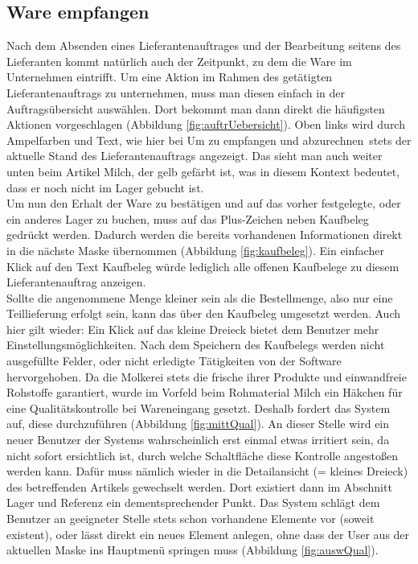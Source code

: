 \subsection{Ware empfangen}
Nach dem Absenden eines Lieferantenauftrages und der Bearbeitung seitens des Lieferanten kommt natürlich auch der Zeitpunkt, zu dem die Ware im Unternehmen eintrifft. Um eine Aktion im Rahmen des getätigten Lieferantenauftrags zu unternehmen, muss man diesen einfach in der Auftragsübersicht auswählen. Dort bekommt man dann direkt die häufigsten Aktionen vorgeschlagen (\vgl Abbildung \ref{fig:auftrUebersicht}). Oben links wird durch Ampelfarben und Text, wie hier bei \glqq Um zu empfangen und abzurechnen\grqq\ stets der aktuelle Stand des Lieferantenauftrags angezeigt. Das sieht man auch weiter unten beim Artikel Milch, der gelb gefärbt ist, was in diesem Kontext bedeutet, dass er noch nicht im Lager gebucht ist.\\
Um nun den Erhalt der Ware zu bestätigen und auf das vorher festgelegte, oder ein anderes Lager zu buchen, muss auf das Plus-Zeichen neben Kaufbeleg gedrückt werden. Dadurch werden die bereits vorhandenen Informationen direkt in die nächste Maske übernommen (\vgl Abbildung \ref{fig:kaufbeleg}). Ein einfacher Klick auf den Text Kaufbeleg würde lediglich alle offenen Kaufbelege zu diesem Lieferantenauftrag anzeigen. \\
Sollte die angenommene Menge kleiner sein als die Bestellmenge, also nur eine Teillieferung erfolgt sein, kann das über den Kaufbeleg umgesetzt werden. Auch hier gilt wieder: Ein Klick auf das kleine Dreieck bietet dem Benutzer mehr Einstellungsmöglichkeiten. Nach dem Speichern des Kaufbelegs werden nicht ausgefüllte Felder, oder nicht erledigte Tätigkeiten von der Software hervorgehoben. Da die Molkerei stets die frische ihrer Produkte und einwandfreie Rohstoffe garantiert, wurde im Vorfeld beim Rohmaterial Milch ein Häkchen für eine Qualitätskontrolle bei Wareneingang gesetzt. Deshalb fordert das System auf, diese durchzuführen (\vgl Abbildung \ref{fig:mittQual}). An dieser Stelle wird ein neuer Benutzer der Systems wahrscheinlich erst einmal etwas irritiert sein, da nicht sofort ersichtlich ist, durch welche Schaltfläche diese Kontrolle angestoßen werden kann. Dafür muss nämlich wieder in die Detailansicht (= kleines Dreieck) des betreffenden Artikels gewechselt werden. Dort existiert dann im Abschnitt Lager und Referenz ein dementsprechender Punkt. Das System schlägt dem Benutzer an geeigneter Stelle stets schon vorhandene Elemente vor (soweit existent), oder lässt direkt ein neues Element anlegen, ohne dass der User aus der aktuellen Maske ins Hauptmenü springen muss (\vgl Abbildung \ref{fig:auswQual}). \\
